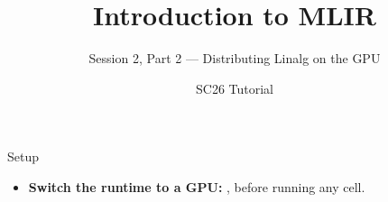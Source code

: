 \documentclass[aspectratio=169,10pt]{beamer}
\title{Introduction to MLIR}
\subtitle{Session 2, Part 2 --- Distributing Linalg on the GPU}
\author{SC26 Tutorial}
\date{}
\begin{document}
\begin{frame}[plain]
  \titlepage
\end{frame}

\begin{frame}{Setup}
  \vspace{0.6em}
  \begin{itemize}
    \item \textbf{Switch the runtime to a GPU:}
      , before running any cell.
  \end{itemize}
\end{frame}

\end{document}
